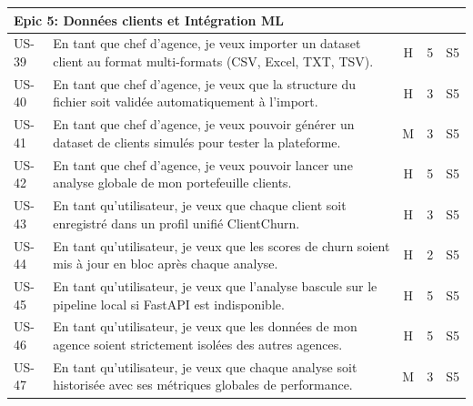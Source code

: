 \begin{footnotesize}
\begin{longtable}{|p{1.2cm}|p{8.5cm}|c|c|c|}
\multicolumn{5}{|l|}{Epic 5: Données clients et Intégration ML} \\
\hline
US-39 & En tant que chef d'agence, je veux importer un dataset client au format multi-formats (CSV, Excel, TXT, TSV). & H & 5 & S5 \\
\hline
US-40 & En tant que chef d'agence, je veux que la structure du fichier soit validée automatiquement à l'import. & H & 3 & S5 \\
\hline
US-41 & En tant que chef d'agence, je veux pouvoir générer un dataset de clients simulés pour tester la plateforme. & M & 3 & S5 \\
\hline
US-42 & En tant que chef d'agence, je veux pouvoir lancer une analyse globale de mon portefeuille clients. & H & 5 & S5 \\
\hline
US-43 & En tant qu'utilisateur, je veux que chaque client soit enregistré dans un profil unifié ClientChurn. & H & 3 & S5 \\
\hline
US-44 & En tant qu'utilisateur, je veux que les scores de churn soient mis à jour en bloc après chaque analyse. & H & 2 & S5 \\
\hline
US-45 & En tant qu'utilisateur, je veux que l'analyse bascule sur le pipeline local si FastAPI est indisponible. & H & 5 & S5 \\
\hline
US-46 & En tant qu'utilisateur, je veux que les données de mon agence soient strictement isolées des autres agences. & H & 5 & S5 \\
\hline
US-47 & En tant qu'utilisateur, je veux que chaque analyse soit historisée avec ses métriques globales de performance. & M & 3 & S5 \\
\hline


\end{longtable}
\end{footnotesize}
